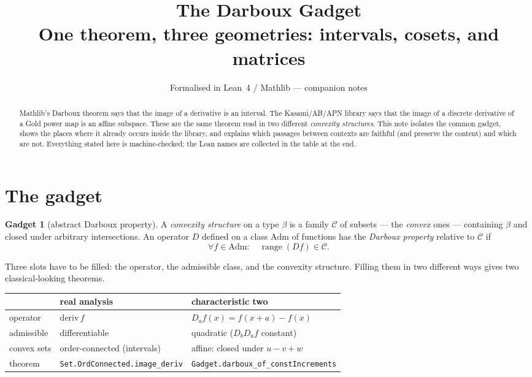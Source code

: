 \documentclass[11pt]{article}
\title{\textbf{The Darboux Gadget}\\[2pt]
\large One theorem, three geometries: intervals, cosets, and matrices}
\author{Formalised in Lean~4 / Mathlib --- companion notes}
\date{}
\newcommand{\lean}[1]{\texttt{\small #1}}
\theoremstyle{definition}
\newtheorem{gadget}{Gadget}
\theoremstyle{plain}
\begin{document}
\maketitle

\begin{abstract}
Mathlib's Darboux theorem says that the image of a derivative is an interval.  The
Kasami/AB/APN library says that the image of a discrete derivative of a Gold power map is an
affine subspace.  These are the same theorem read in two different \emph{convexity
structures}.  This note isolates the common gadget, shows the places where it already occurs
inside the library, and explains which passages between contexts are faithful (and preserve
the content) and which are not.  Everything stated here is machine-checked; the Lean names
are collected in the table at the end.
\end{abstract}

\section{The gadget}

\begin{gadget}[abstract Darboux property]
A \emph{convexity structure} on a type $\beta$ is a family $\mathcal{C}$ of subsets --- the
\emph{convex} ones --- containing $\beta$ and closed under arbitrary intersections.  An
operator $D$ defined on a class $\mathrm{Adm}$ of functions has the \emph{Darboux property}
relative to $\mathcal{C}$ if
\[
   \forall f \in \mathrm{Adm} : \quad \operatorname{range}(Df) \in \mathcal{C}.
\]
\end{gadget}

Three slots have to be filled: the operator, the admissible class, and the convexity
structure.  Filling them in two different ways gives two classical-looking theorems.

\begin{center}
\begin{tabular}{@{}lll@{}}
\toprule
 & real analysis & characteristic two \\
\midrule
operator      & $\mathrm{deriv}\,f$ & $D_a f(x) = f(x+a) - f(x)$ \\
admissible    & differentiable & quadratic ($D_bD_af$ constant) \\
convex sets   & order-connected (intervals) & affine: closed under $u-v+w$ \\
theorem       & \lean{Set.OrdConnected.image\_deriv} & \lean{Gadget.darboux\_of\_constIncrements} \\
\bottomrule
\end{tabular}
\end{center}
\end{document}
